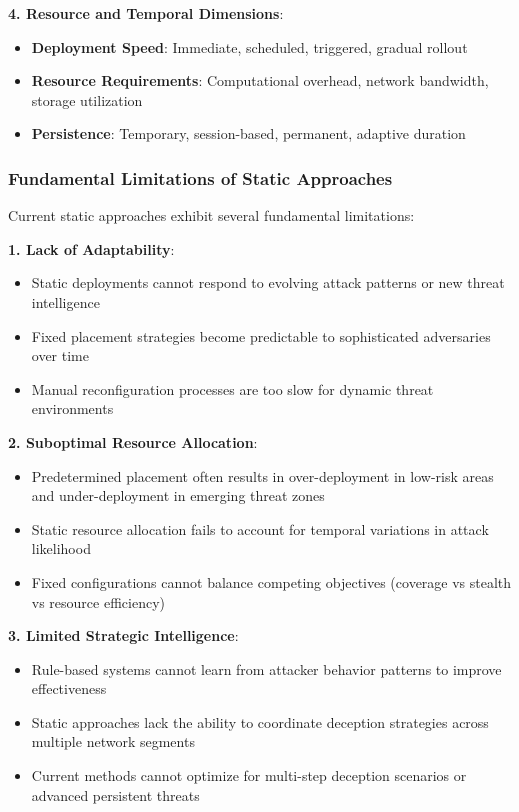 \documentclass[12pt]{article}
\theoremstyle{definition}
\theoremstyle{plain}
\begin{document}
\textbf{4. Resource and Temporal Dimensions}:
\begin{itemize}
\item \textbf{Deployment Speed}: Immediate, scheduled, triggered, gradual rollout
\item \textbf{Resource Requirements}: Computational overhead, network bandwidth, storage utilization
\item \textbf{Persistence}: Temporary, session-based, permanent, adaptive duration
\end{itemize}

\subsubsection{Fundamental Limitations of Static Approaches}

Current static approaches exhibit several fundamental limitations:

\textbf{1. Lack of Adaptability}:
\begin{itemize}
\item Static deployments cannot respond to evolving attack patterns or new threat intelligence
\item Fixed placement strategies become predictable to sophisticated adversaries over time
\item Manual reconfiguration processes are too slow for dynamic threat environments
\end{itemize}

\textbf{2. Suboptimal Resource Allocation}:
\begin{itemize}
\item Predetermined placement often results in over-deployment in low-risk areas and under-deployment in emerging threat zones
\item Static resource allocation fails to account for temporal variations in attack likelihood
\item Fixed configurations cannot balance competing objectives (coverage vs stealth vs resource efficiency)
\end{itemize}

\textbf{3. Limited Strategic Intelligence}:
\begin{itemize}
\item Rule-based systems cannot learn from attacker behavior patterns to improve effectiveness
\item Static approaches lack the ability to coordinate deception strategies across multiple network segments
\item Current methods cannot optimize for multi-step deception scenarios or advanced persistent threats
\end{itemize}
\end{document}
